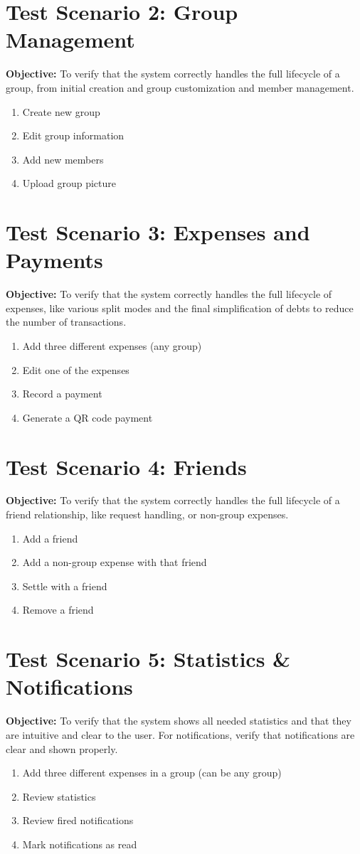\documentclass{ctuthesis}
\begin{document}
\section{Test Scenario 2: Group Management}
\textbf{Objective:} To verify that the system correctly handles the full lifecycle of a group, from initial creation and group customization and member management.

\begin{enumerate}
    \item Create new group
    \item Edit group information
    \item Add new members
    \item Upload group picture
\end{enumerate}

\section{Test Scenario 3: Expenses and Payments}
\textbf{Objective:} To verify that the system correctly handles the full lifecycle of expenses, like various split modes and the final simplification of debts to reduce the number of transactions.

\begin{enumerate}
    \item Add three different expenses (any group)
    \item Edit one of the expenses
    \item Record a payment
    \item Generate a QR code payment
\end{enumerate}

\section{Test Scenario 4: Friends}
\textbf{Objective:} To verify that the system correctly handles the full lifecycle of a friend relationship, like request handling, or non-group expenses.

\begin{enumerate}
    \item Add a friend
    \item Add a non-group expense with that friend
    \item Settle with a friend
    \item Remove a friend
\end{enumerate}

\section{Test Scenario 5: Statistics \& Notifications}
\textbf{Objective:} To verify that the system shows all needed statistics and that they are intuitive and clear to the user. For notifications, verify that notifications are clear and shown properly.

\begin{enumerate}
    \item Add three different expenses in a group (can be any group)
    \item Review statistics
    \item Review fired notifications
    \item Mark notifications as read
\end{enumerate}
\end{document}
